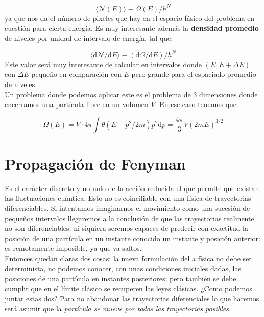 \documentclass[12pt]{article}
\newcommand{\parentesis}[1]{\left( #1  \right)}
\newcommand{\D}{\mathrm{d}}
\begin{document}
\begin{equation}
\langle \mathcal{N} (E) \rangle \equiv \Omega (E) / h^N
\end{equation}
ya que nos da el número de pixeles que hay en el espacio fásico del problema en cuestión para cierta energía. Es muy interesante además la \textbf{densidad promedio} de niveles por unidad de intervalo de energía, tal que:

\begin{equation}
\langle \D  \mathcal{N} / \D E \rangle \equiv (\D  \Omega / \D E) / h^N
\end{equation}
Este valor será muy interesante de calcular en intervalos donde $(E,E + \Delta E)$ con $\Delta E$ pequeño en comparación con $E$ pero grande para el espaciado promedio de niveles. \\

Un problema donde podemos aplicar este es el problema de 3 dimensiones donde encerramos una partícula libre en un volumen $V$. En ese caso tenemos que 

$$ \Omega(E) = V \cdot 4 \pi \int \theta(E - p^2/2m) p^2 \D p = \dfrac{4 \pi}{3}  V \parentesis{2mE}^{3/2}  $$

\newpage


\section{Propagación de Fenyman}

Es el carácter discreto y no nulo de la acción reducida el que permite que existan las fluctuaciones cuántica. Esto no es coinciliable con una física de trayectorias diferenciables. Si intentamos imaginarnos el movimiento como una sucesión de pequeños intervalos llegaremos a la conclusión de que las trayectorias realmente no son diferenciables, ni siquiera seremos capaces de predecir con exactitud la posición de una partícula en un instante conocido un instante y posición anterior: es remotamente imposible, ya que va saltos. \\

Entonces quedan claras dos cosas: la nueva formulación del a física no debe ser determinista, no podemos conocer, con unas condiciones iniciales dadas, las posiciones de una partícula en instantes posteriores; pero también se debe cumplir que en el límite clásico se recuperen las leyes clásicas. ¿Como podemos juntar estas dos? Para no abandonar las trayectorias diferenciales lo que haremos será asumir que la \textit{partícula se mueve por todas las trayectorias posibles}.  \\
\end{document}
